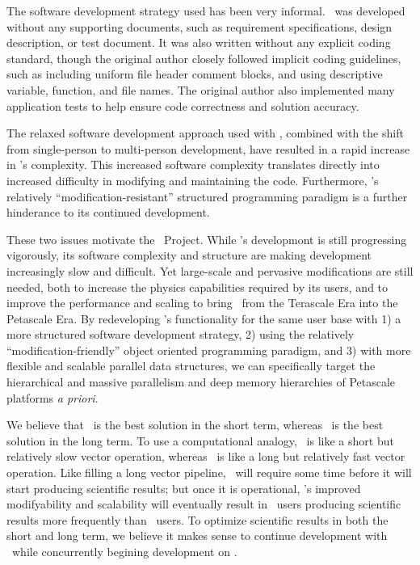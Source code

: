 \documentclass[11pt]{article}
\begin{document}
    The software development strategy used has been very informal.
    \enzo\ was developed without any supporting documents, such as
    requirement specifications, design description, or test document.
    It was also written without any explicit coding standard, though
    the original author closely followed implicit coding guidelines,
    such as including uniform file header comment blocks, and using
    descriptive variable, function, and file names.  The original
    author also implemented many application tests to help ensure
    code correctness and solution accuracy.  

    The relaxed software development approach used with \enzo,
    combined with the shift from single-person to multi-person
    development, have resulted in a rapid increase in \enzo's
    complexity.  This increased software complexity translates
    directly into increased difficulty in modifying and maintaining
    the code.  Furthermore, \enzo's relatively
    ``modification-resistant'' structured programming paradigm is a
    further hinderance to its continued development.
    


    These two issues motivate the \cello\ Project.  While \enzo's
    developmont is still progressing vigorously, its software
    complexity and structure are making development increasingly slow
    and difficult.  Yet large-scale and pervasive modifications are
    still needed, both to increase the physics capabilities required
    by its users, and to improve the performance and scaling to bring
    \enzo\ from the Terascale Era into the Petascale Era.  By
    redeveloping \enzo's functionality for the same user base with 1)
    a more structured software development strategy, 2) using the
    relatively ``modification-friendly'' object oriented programming
    paradigm, and 3) with more flexible and scalable
    parallel data structures, we can specifically target the hierarchical and
    massive parallelism and deep memory hierarchies of Petascale
    platforms \textit{a priori}.


    We believe that \enzo\ is the best solution in the short term,
    whereas \cello\ is the best solution in the long term.  To use a
    computational analogy, \enzo\ is like a short but relatively slow
    vector operation, whereas \cello\ is like a long but relatively
    fast vector operation.  Like filling a long vector pipeline,
    \cello\ will require some time before it will start producing
    scientific results; but once it is operational, \cello's improved
    modifyability and scalability will eventually result in \cello\
    users producing scientific results more frequently than \enzo\
    users.  To optimize scientific results in both the short and long
    term, we believe it makes sense to continue development with
    \enzo\ while concurrently begining development on \cello.
  
\end{document}
